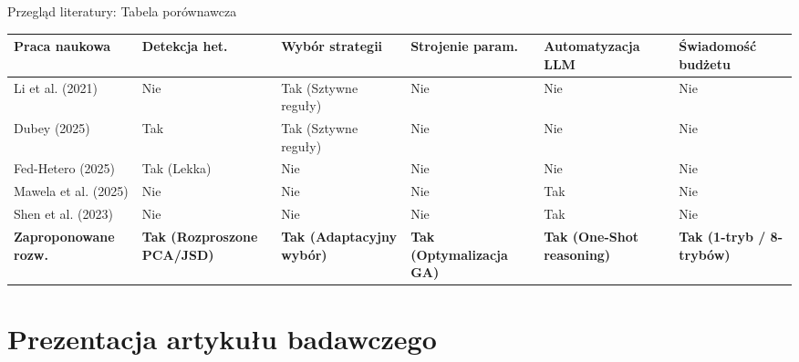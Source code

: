 \documentclass[9pt,aspectratio=169]{beamer}
\newcommand{\sekcjaaktualna}{}
\newcommand{\ustawsekcje}[1]{\renewcommand{\sekcjaaktualna}{#1}}
\begin{document}
\begin{frame}{Przegląd literatury: Tabela porównawcza}
\centering\scriptsize
\setlength{\tabcolsep}{3pt}
\renewcommand{\arraystretch}{1.35}
\begin{tabular}{p{2.1cm}p{1.75cm}p{1.95cm}p{1.55cm}p{1.75cm}p{1.85cm}}
\toprule
\textbf{Praca naukowa} & \textbf{Detekcja het.} & \textbf{Wybór strategii} & \textbf{Strojenie param.} & \textbf{Automatyzacja LLM} & \textbf{Świadomość budżetu}\\
\midrule
Li et al. (2021) & Nie & Tak (Sztywne reguły) & Nie & Nie & Nie\\
Dubey (2025) & Tak & Tak (Sztywne reguły) & Nie & Nie & Nie\\
Fed-Hetero (2025) & Tak (Lekka) & Nie & Nie & Nie & Nie\\
Mawela et al. (2025) & Nie & Nie & Nie & Tak & Nie\\
Shen et al. (2023) & Nie & Nie & Nie & Tak & Nie\\
\rowcolor{lightgray}\textbf{Zaproponowane rozw.} & \textbf{Tak (Rozproszone PCA/JSD)} & \textbf{Tak (Adaptacyjny wybór)} & \textbf{Tak (Optymalizacja GA)} & \textbf{Tak (One-Shot reasoning)} & \textbf{Tak (1-tryb / 8-trybów)}\\
\bottomrule
\end{tabular}
\end{frame}

\ustawsekcje{Sekcja 2: Prezentacja artykułu badawczego}
\section{Prezentacja artykułu badawczego}
\end{document}
